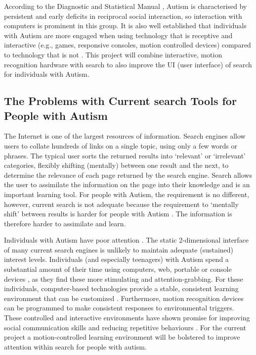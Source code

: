 \documentclass[a4paper, 11pt]{article}
\begin{document}
\begin{justify}
According to the Diagnostic and Statistical Manual \cite{CDC}, Autism is characterised by persistent and early deficits in reciprocal social interaction, so interaction with computers is prominent in this group. It is also well established that individuals with Autism are more engaged when using technology that is receptive and interactive (e.g., games, responsive consoles, motion controlled devices) compared to technology that is not \cite{motioncontrollerforautism}. This project will combine interactive, motion recognition hardware with search to also improve the UI (user interface) of search for individuals with Autism.

\subsection{The Problems with Current search Tools for People with Autism}\label{What should search offer people with Autism}

The Internet is one of the largest resources of information. Search engines allow users to collate hundreds of links on a single topic, using only a few words or phrases. The typical user sorts the returned results into `relevant' or `irrelevant' categories, flexibly shifting (mentally) between one result and the next, to determine the relevance of each page returned by the search engine. Search allows the user to assimilate the information on the page into their knowledge and is an important learning tool. For people with Autism, the requirement is no different, however, current search is not adequate because the requirement to `mentally shift' between results is harder for people with Autism \cite{disengagement}. The information is therefore harder to assimilate and learn. 

Individuals with Autism have poor attention \cite{attention}. The static 2-dimensional interface of many current search engines is unlikely to maintain adequate (sustained) interest levels. Individuals (and especially teenagers) with Autism spend a substantial amount of their time using computers, web, portable or console devices \cite{Shane and Albert}, as they find these more stimulating and attention-grabbing. For these individuals, computer-based technologies provide a stable, consistent learning environment that can be customized \cite{moore}. Furthermore, motion recognition devices can be programmed to make consistent responses to environmental triggers. These controlled and interactive environments have shown promise for improving social communication skills and reducing repetitive behaviours \cite{gameshealth}. For the current project a motion-controlled learning environment will be bolstered to improve attention within search for people with autism. 


\end{justify}
\end{document}

